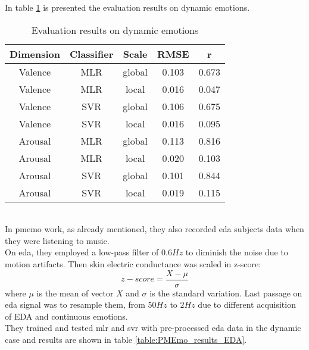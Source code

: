 In table \ref{table:PMEmo_results_dynamic} is presented the evaluation results on dynamic emotions.
\begin{table}[h!]
	\centering
	\begin{tabular}{|c|c|c|c|c|}
		\hline
		Dimension & Classifier & Scale & RMSE & r \\ [0.5ex] 
		\hline\hline Valence & MLR & global & 0.103 & 0.673 \\
		\hline Valence & MLR & local & 0.016 & 0.047 \\
		\hline Valence & SVR & global & 0.106 & 0.675 \\
		\hline Valence & SVR & local & 0.016 & 0.095 \\
		\hline Arousal & MLR & global & 0.113 & 0.816 \\
		\hline Arousal & MLR & local & 0.020 & 0.103 \\
		\hline Arousal & SVR & global & 0.101 & 0.844 \\
		\hline Arousal & SVR & local & 0.019 & 0.115 \\
		\hline
	\end{tabular}
	\caption{Evaluation results on dynamic emotions}
	\label{table:PMEmo_results_dynamic}
\end{table}
\\
In \gls{pmemo} work, as already mentioned, they also recorded \gls{eda} subjects data when they were listening to music.
\\
On \gls{eda}, they employed a low-pass filter of $0.6Hz$ to diminish the noise due to motion artifacts. Then skin electric conductance was scaled in z-score:
\begin{equation}
	z-score=\dfrac{X-\mu}{\sigma}
\end{equation}
where $\mu$ is the mean of vector $X$ and $\sigma$ is the standard variation.
Last passage on \gls{eda} signal was to resample them, from $50Hz$ to $2Hz$ due to different acquisition of EDA and continuous emotions.
\\
They trained and tested \gls{mlr} and \gls{svr} with pre-processed \gls{eda} data in the dynamic case and results are shown in table \ref{table:PMEmo_results_EDA}.
